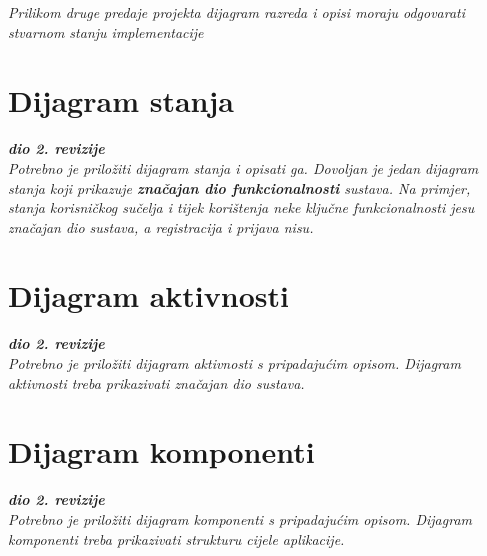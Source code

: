 			\textit{Prilikom druge predaje projekta dijagram razreda i opisi moraju odgovarati stvarnom stanju implementacije}
			
			
			
			\eject
		
		\section{Dijagram stanja}
			
			
			\textbf{\textit{dio 2. revizije}}\\
			
			\textit{Potrebno je priložiti dijagram stanja i opisati ga. Dovoljan je jedan dijagram stanja koji prikazuje \textbf{značajan dio funkcionalnosti} sustava. Na primjer, stanja korisničkog sučelja i tijek korištenja neke ključne funkcionalnosti jesu značajan dio sustava, a registracija i prijava nisu. }
			
			
			\eject 
		
		\section{Dijagram aktivnosti}
			
			\textbf{\textit{dio 2. revizije}}\\
			
			 \textit{Potrebno je priložiti dijagram aktivnosti s pripadajućim opisom. Dijagram aktivnosti treba prikazivati značajan dio sustava.}
			
			\eject
		\section{Dijagram komponenti}
		
			\textbf{\textit{dio 2. revizije}}\\
		
			 \textit{Potrebno je priložiti dijagram komponenti s pripadajućim opisom. Dijagram komponenti treba prikazivati strukturu cijele aplikacije.}